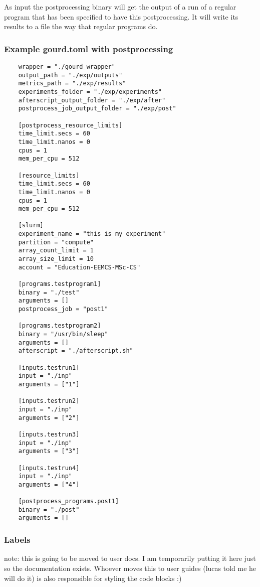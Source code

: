 As input the postprocessing binary will get the output of a run of a regular program that has been specified to have
this postprocessing. It will write its results to a file the way that regular programs do.

\subsubsection{Example gourd.toml with postprocessing}

\begin{verbatim}
    wrapper = "./gourd_wrapper"
    output_path = "./exp/outputs"
    metrics_path = "./exp/results"
    experiments_folder = "./exp/experiments"
    afterscript_output_folder = "./exp/after"
    postprocess_job_output_folder = "./exp/post"
    
    [postprocess_resource_limits]
    time_limit.secs = 60
    time_limit.nanos = 0
    cpus = 1
    mem_per_cpu = 512
    
    [resource_limits]
    time_limit.secs = 60
    time_limit.nanos = 0
    cpus = 1
    mem_per_cpu = 512
    
    [slurm]
    experiment_name = "this is my experiment"
    partition = "compute"
    array_count_limit = 1
    array_size_limit = 10
    account = "Education-EEMCS-MSc-CS"
    
    [programs.testprogram1]
    binary = "./test"
    arguments = []
    postprocess_job = "post1"
    
    [programs.testprogram2]
    binary = "/usr/bin/sleep"
    arguments = []
    afterscript = "./afterscript.sh"
    
    [inputs.testrun1]
    input = "./inp"
    arguments = ["1"]
    
    [inputs.testrun2]
    input = "./inp"
    arguments = ["2"]
    
    [inputs.testrun3]
    input = "./inp"
    arguments = ["3"]
    
    [inputs.testrun4]
    input = "./inp"
    arguments = ["4"]
    
    [postprocess_programs.post1]
    binary = "./post"
    arguments = []
\end{verbatim}

\subsubsection{Labels}
note: this is going to be moved to user docs.
I am temporarily putting it here just so the documentation exists.
Whoever moves this to user guides (lucas told me he will do it) is also responsible for styling the code blocks :)

